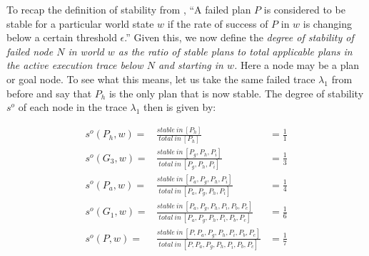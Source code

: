 To recap the definition of stability from \cite{singh10:learning}, ``A failed plan $P$ is considered to be stable for a particular world state $w$ if the rate of success of $P$ in $w$ is changing below a certain threshold $\epsilon$.'' %
Given this, we now define the {\em degree of stability of failed node $N$ in world $w$ as the ratio of stable plans to total applicable plans in the active execution trace below $N$ and starting in $w$.} Here a node may be a plan or goal node. To see what this means, let us take the same failed trace $\lambda_1$ from before and say that $P_h$ is the only plan that is now stable. The degree of stability $s^o$ of each node in the trace $\lambda_1$ then is given by:

\begin{eqnarray*}
s^o(P_h,w) = & \frac{stable~in~[P_h]}{total~in~[P_h]} & = \frac{1}{1}  \\
s^o(G_3,w) = & \frac{stable~in~[P_g,P_h,P_i]}{total~in~[P_g,P_h,P_i]} & = \frac{1}{3}  \\
s^o(P_a,w) = & \frac{stable~in~[P_a,P_g,P_h,P_i]}{total~in~[P_a,P_g,P_h,P_i]} & = \frac{1}{4} \\
s^o(G_1,w) = & \frac{stable~in~[P_a,P_g,P_h,P_i,P_b,P_c]}{total~in~[P_a,P_g,P_h,P_i,P_b,P_c]} & = \frac{1}{6}  \\
s^o(P,w) = & \frac{stable~in~[P,P_a,P_g,P_h,P_i,P_b,P_c]}{total~in~[P,P_a,P_g,P_h,P_i,P_b,P_c]} & = \frac{1}{7} 
\end{eqnarray*}

